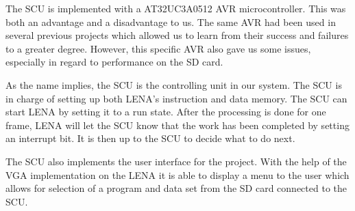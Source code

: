 The \acf{SCU} is implemented with a AT32UC3A0512 AVR microcontroller. This was both an advantage and a disadvantage to us. The same AVR had been used in several previous projects which allowed us to learn from their success and failures to a greater degree. However, this specific AVR also gave us some issues, especially in regard to performance on the \ac{SD} card.

As the name implies, the \ac{SCU} is the controlling unit in
our system. The \ac{SCU} is in charge of setting up both \ac{LENA}'s instruction
and data memory. The \ac{SCU} can start \ac{LENA} by setting it to a run state. 
After the processing is done for one frame, \ac{LENA} will let the \ac{SCU} know
that the work has been completed by setting an interrupt bit. It is then up to
the \ac{SCU} to decide what to do next.

The \ac{SCU} also implements the user interface for the project. With the help
of the \ac{VGA} implementation on the \ac{LENA} it is able to display a menu to
the user which allows for selection of a program and data set from the \ac{SD}
card connected to the \ac{SCU}.

